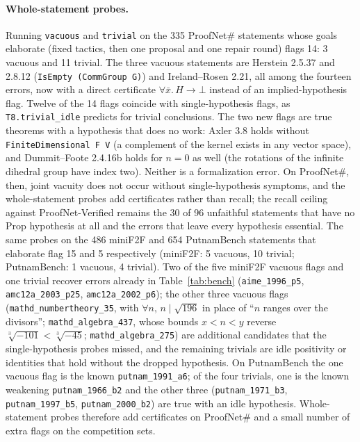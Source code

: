 \documentclass[10pt]{article}
\theoremstyle{definition}
\begin{document}
\paragraph{Whole-statement probes.}\label{sec:global} Running \texttt{vacuous} and
\texttt{trivial} on the 335 ProofNet\# statements whose goals elaborate (fixed tactics, then
one proposal and one repair round) flags 14: 3 vacuous and 11 trivial. The three vacuous
statements are Herstein 2.5.37 and 2.8.12 (\texttt{IsEmpty (CommGroup G)}) and
Ireland--Rosen 2.21, all among the fourteen errors, now with a direct certificate
$\forall\bar x.\,H\to\bot$ instead of an implied-hypothesis flag. Twelve of the 14 flags
coincide with single-hypothesis flags, as \texttt{T8.trivial\_idle} predicts for trivial
conclusions. The two new flags are true theorems with a hypothesis that does no work: Axler 3.8
holds without \texttt{FiniteDimensional F V} (a complement of the kernel exists in any
vector space), and Dummit--Foote 2.4.16b holds for $n=0$ as well (the rotations of the
infinite dihedral group have index two). Neither is a formalization error. On ProofNet\#,
then, joint vacuity does not occur without single-hypothesis symptoms, and the
whole-statement probes add certificates rather than recall; the recall ceiling against
ProofNet-Verified remains the 30 of 96 unfaithful statements that have no Prop hypothesis
at all and the errors that leave every hypothesis essential. The same probes on the 486
miniF2F and 654 PutnamBench statements that elaborate flag 15 and 5 respectively
(miniF2F: 5 vacuous, 10 trivial; PutnamBench: 1 vacuous, 4 trivial). Two of the five
miniF2F vacuous flags and one trivial recover errors already in Table~\ref{tab:bench}
(\texttt{aime\_1996\_p5}, \texttt{amc12a\_2003\_p25}, \texttt{amc12a\_2002\_p6}); the other
three vacuous flags (\texttt{mathd\_numbertheory\_35}, with $\forall n,\,n\mid\sqrt{196}$
in place of ``$n$ ranges over the divisors''; \texttt{mathd\_algebra\_437}, whose bounds
$x<n<y$ reverse $\sqrt[3]{-101}<\sqrt[3]{-45}$; \texttt{mathd\_algebra\_275}) are additional
candidates that the single-hypothesis probes missed, and the remaining trivials are idle
positivity or identities that hold without the dropped hypothesis. On PutnamBench the one
vacuous flag is the known \texttt{putnam\_1991\_a6}; of the four trivials, one is the known
weakening \texttt{putnam\_1966\_b2} and the other three (\texttt{putnam\_1971\_b3},
\texttt{putnam\_1997\_b5}, \texttt{putnam\_2000\_b2}) are true with an idle hypothesis. Whole-statement probes therefore
add certificates on ProofNet\# and a small number of extra flags on the competition sets.
\end{document}
